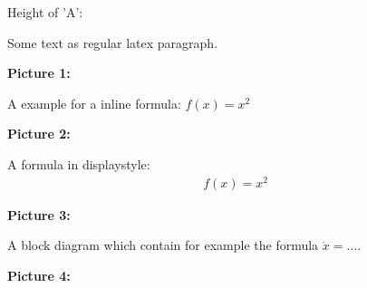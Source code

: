 \documentclass[11pt]{article}
\begin{document}
    Height of 'A': \the\BplLengthUnit

    \vfill

    Some text as regular latex paragraph.

    \textbf{Picture 1:}

        
    \vfill

    A example for a inline formula: $f(x) = x^2$

    \textbf{Picture 2:}

        
    \vfill

    A formula in displaystyle:
    \begin{align*}
        f(x) = x^2
    \end{align*}

    \textbf{Picture 3:}

        
    \vfill

    A block diagram which contain for example the formula $\dot x = \dots$.

    \textbf{Picture 4:}

        
\end{document}
